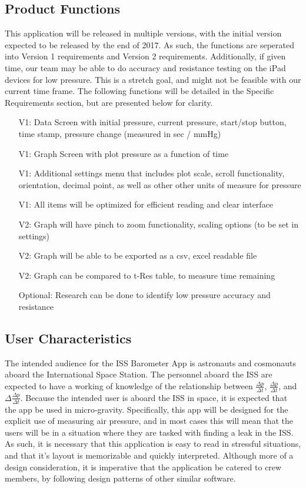 \documentclass[onecolumn, draftclsnofoot,10pt, compsoc]{IEEEtran}
\def \CapstoneProjectName{ISS Barometer App }
\begin{document}
\subsection{Product Functions}
This application will be released in multiple versions, with the initial version expected to be released by the end of 2017.
As such, the functions are seperated into Version 1 requirements and Version 2 requirements.
Additionally, if given time, our team may be able to do accuracy and resistance testing on the iPad devices for low pressure.
This is a stretch goal, and might not be feasible with our current time frame.
The following functions will be detailed in the Specific Requirements section, but are presented below for clarity.
\begin{itemize}
\item[V1:] Data Screen with initial pressure, current pressure, start/stop button, time stamp, pressure change (measured in sec / mmHg)
\item[V1:] Graph Screen with plot pressure as a function of time
\item[V1:] Additional settings menu that includes plot scale, scroll functionality, orientation, decimal point, as well as other other units of measure for pressure
\item[V1:] All items will be optimized for efficient reading and clear interface
\item[V2:] Graph will have pinch to zoom functionality, scaling options (to be set in settings)
\item[V2:] Graph will be able to be exported as a csv, excel readable file
\item[V2:] Graph can be compared to t-Res table, to measure time remaining
\item[Optional:] Research can be done to identify low pressure accuracy and resistance
\end{itemize}

\subsection{User Characteristics}
The intended audience for the \CapstoneProjectName is astronauts and cosmonauts aboard the International Space Station.
The personnel aboard the ISS are expected to have a working of knowledge of the relationship between $\frac{\Delta p}{\Delta t}$, $\frac{\Delta p}{\Delta t}$, and $\Delta \frac{\Delta p}{\Delta t}$.
Because the intended user is aboard the ISS in space, it is expected that the app be used in micro-gravity.
Specifically, this app will be designed for the explicit use of measuring air pressure, and in most cases this will mean that the users will be in a situation where they are tasked with finding a leak in the ISS.
As such, it is necessary that this application is easy to read in stressful situations, and that it's layout is memorizable and quickly interpreted.
Although more of a design consideration, it is imperative that the application be catered to crew members, by following design patterns of other similar software.
\end{document}

